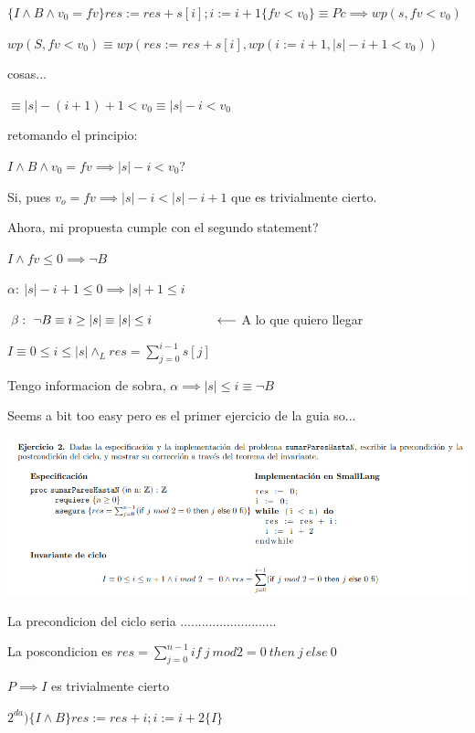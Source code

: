 \documentclass[a4paper,10pt]{article}
\begin{document}
$\{I\land B \land v_0=fv\} res:=res+s[i];i:=i+1 \{fv<v_0\}\equiv Pc\implies wp(s,fv<v_0)$

\salto{\baselineskip}

$wp(S,fv<v_0)\equiv wp(res:=res+s[i], wp(i:=i+1, |s|-i+1<v_0))$

cosas...

\hspace*{2em}$\equiv |s|-(i+1)+1<v_0 \equiv |s|-i<v_0$

\salto{\baselineskip}

retomando el principio:

$I\land B \land v_0=fv \implies |s|-i<v_0$?

Si, pues $ v_o=fv \implies |s|-i<|s|-i+1$ que es trivialmente cierto.

Ahora, mi propuesta cumple con el segundo statement?

$I \land fv\leq 0 \implies \lnot B$

$\alpha:\ |s|-i+1\leq 0 \implies |s|+1\leq i$

$\beta:\ \lnot B \equiv i\geq |s| \equiv |s|\leq i\hspace*{5em} \longleftarrow $A lo que quiero llegar

$I\equiv 0\leq i \leq |s| \land_L res=\sum_{j=0}^{i-1}s[j]$

Tengo informacion de sobra, $\alpha \implies |s| \leq i \equiv \lnot B$

Seems a bit too easy pero es el primer ejercicio de la guia so...


\pagebreak


\includegraphics[width=\textwidth]{e2.png}

La precondicion del ciclo seria ...........................

La poscondicion es $res=\sum_{j=0}^{n-1}if\ j\ mod 2 = 0\ then\ j\ else\ 0$

$P\implies I$ es trivialmente cierto

\salto{\baselineskip}

$2^{da})$$\{I \land B \} res:=res+i; i:=i+2\{I\}$
\end{document}
